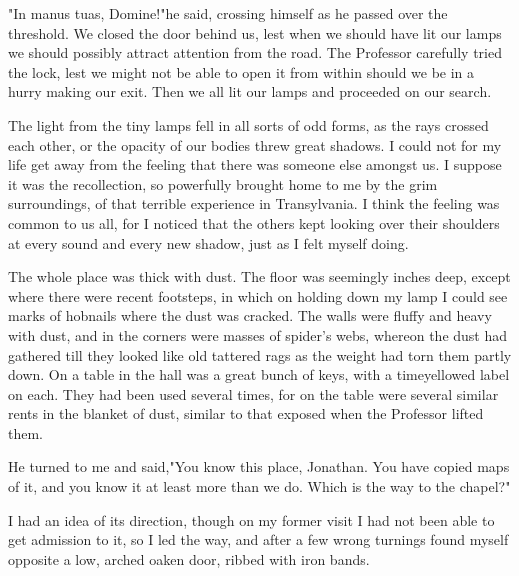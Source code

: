 "In manus tuas, Domine!"he said, crossing himself as he passed over the threshold. We closed the door behind us, lest when we should have lit our lamps we should possibly attract attention from the road. The Professor carefully tried the lock, lest we might not be able to open it from within should we be in a hurry making our exit. Then we all lit our lamps and proceeded on our search. 

The light from the tiny lamps fell in all sorts of odd forms, as the rays crossed each other, or the opacity of our bodies threw great shadows. I could not for my life get away from the feeling that there was someone else amongst us. I suppose it was the recollection, so powerfully brought home to me by the grim surroundings, of that terrible experience in Transylvania. I think the feeling was common to us all, for I noticed that the others kept looking over their shoulders at every sound and every new shadow, just as I felt myself doing. 

The whole place was thick with dust. The floor was seemingly inches deep, except where there were recent footsteps, in which on holding down my lamp I could see marks of hobnails where the dust was cracked. The walls were fluffy and heavy with dust, and in the corners were masses of spider's webs, whereon the dust had gathered till they looked like old tattered rags as the weight had torn them partly down. On a table in the hall was a great bunch of keys, with a timeyellowed label on each. They had been used several times, for on the table were several similar rents in the blanket of dust, similar to that exposed when the Professor lifted them. 

He turned to me and said,"You know this place, Jonathan. You have copied maps of it, and you know it at least more than we do. Which is the way to the chapel?" 

I had an idea of its direction, though on my former visit I had not been able to get admission to it, so I led the way, and after a few wrong turnings found myself opposite a low, arched oaken door, ribbed with iron bands. 

